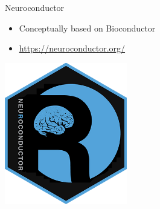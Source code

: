\documentclass[
  ignorenonframetext,
]{beamer}
\providecommand{\tightlist}{%
  \setlength{\itemsep}{0pt}\setlength{\parskip}{0pt}}
\begin{document}
\begin{frame}{Neuroconductor}
\protect\hypertarget{neuroconductor}{}

\begin{itemize}
\tightlist
\item
  Conceptually based on Bioconductor
\item
  \url{https://neuroconductor.org/}
\end{itemize}

\includegraphics[width=0.4\textwidth,height=\textheight]{../external/images/neuro_logo1.png}

\end{frame}
\end{document}
